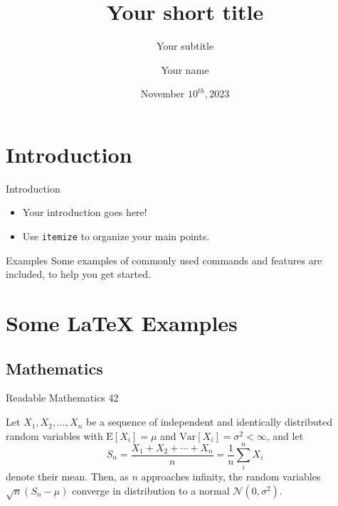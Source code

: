 \documentclass[10pt,xcolor={table,dvipsnames},t]{beamer}
\title[Your Short Title]{Your short title}
\subtitle{Your subtitle}
\author{Your name}
\institute{Your affiliation}
\date{November $10^{th}, 2023$}
\begin{document}
\begin{frame}
  \titlepage
\end{frame}



\section{Introduction}

\begin{frame}{Introduction}

\begin{itemize}
  \item Your introduction goes here!
  \item Use \texttt{itemize} to organize your main points.
\end{itemize}

\begin{block}{Examples}
Some examples of commonly used commands and features are included, to help you get started.
\end{block}

\end{frame}

\section{Some \LaTeX{} Examples}

\subsection{Mathematics}

\begin{frame}{Readable Mathematics 42}

Let $X_1, X_2, \ldots, X_n$ be a sequence of independent and identically distributed random variables with $\text{E}[X_i] = \mu$ and $\text{Var}[X_i] = \sigma^2 < \infty$, and let
$$S_n = \frac{X_1 + X_2 + \cdots + X_n}{n}
      = \frac{1}{n}\sum_{i}^{n} X_i$$
denote their mean. Then, as $n$ approaches infinity, the random variables $\sqrt{n}(S_n - \mu)$ converge in distribution to a normal $\mathcal{N}(0, \sigma^2)$.

\end{frame}
\end{document}
